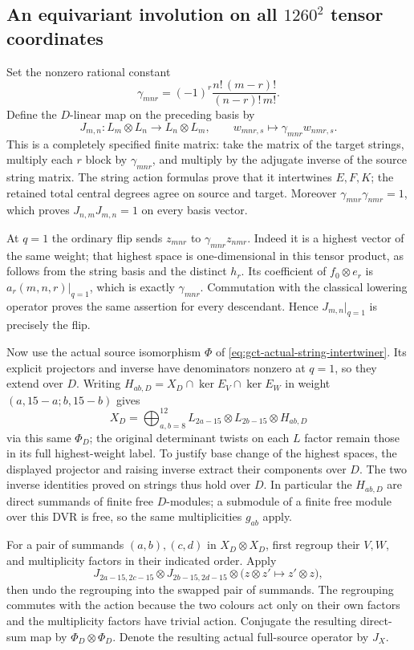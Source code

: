 \subsection{An equivariant involution on all $1260^2$ tensor coordinates}

Set the nonzero rational constant
\[
 \gamma_{mnr}=(-1)^r\frac{n!\,(m-r)!}{(n-r)!\,m!}.
\]
Define the $D$-linear map on the preceding basis by
\begin{equation}\label{eq:qt-commutor}
 J_{m,n}:L_m\otimes L_n\longrightarrow L_n\otimes L_m,
 \qquad w_{mnr,s}\longmapsto\gamma_{mnr}w_{nmr,s}.
\end{equation}
This is a completely specified finite matrix: take the matrix of
the target strings, multiply each $r$ block by $\gamma_{mnr}$,
and multiply by the adjugate inverse of the source string matrix.
The string action formulas prove that it intertwines $E,F,K$;
the retained total central degrees agree on source and target.
Moreover $\gamma_{mnr}\gamma_{nmr}=1$, which proves
$J_{n,m}J_{m,n}=1$ on every basis vector.

At $q=1$ the ordinary flip sends $z_{mnr}$ to
$\gamma_{mnr}z_{nmr}$. Indeed it is a highest vector of the same
weight; that highest space is one-dimensional in this tensor
product, as follows from the string basis and the distinct $h_r$.
Its coefficient of $f_0\otimes e_r$ is $a_r(m,n,r)|_{q=1}$,
which is exactly $\gamma_{mnr}$. Commutation with the classical
lowering operator proves the same assertion for every descendant.
Hence $J_{m,n}|_{q=1}$ is precisely the flip.

Now use the actual source isomorphism $\Phi$ of
\eqref{eq:gct-actual-string-intertwiner}. Its explicit projectors and
inverse have denominators nonzero at $q=1$, so they extend over $D$.
Writing $H_{ab,D}=X_D\cap\ker E_V\cap\ker E_W$ in weight
$(a,15-a;b,15-b)$ gives
\[
 X_D=\bigoplus_{a,b=8}^{12}
 L_{2a-15}\otimes L_{2b-15}\otimes H_{ab,D}
\]
via this same $\Phi_D$; the original determinant twists on each
$L$ factor remain those in its full highest-weight label.
To justify base change of the highest spaces, the displayed
projector and raising inverse extract their components over $D$.
The two inverse identities proved on strings thus hold over $D$.
In particular the $H_{ab,D}$ are direct summands of finite free
$D$-modules; a submodule of a finite free module over this DVR
is free, so the same multiplicities $g_{ab}$ apply.

For a pair of summands $(a,b),(c,d)$ in $X_D\otimes X_D$, first
regroup their $V,W$, and multiplicity factors in their indicated
order. Apply
\[
 J_{2a-15,2c-15}\otimes J_{2b-15,2d-15}
 \otimes\bigl(z\otimes z'\longmapsto z'\otimes z\bigr),
\]
then undo the regrouping into the swapped pair of summands.
The regrouping commutes with the action because the two colours
act only on their own factors and the multiplicity factors have
trivial action. Conjugate the resulting direct-sum map by
$\Phi_D\otimes\Phi_D$. Denote the resulting actual full-source
operator by $J_X$.

